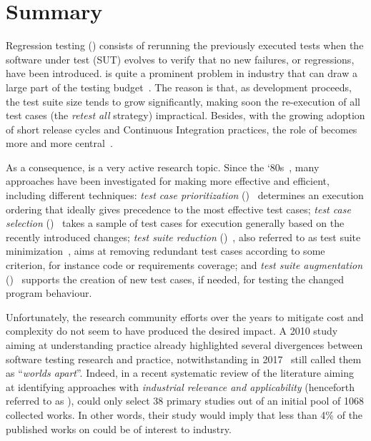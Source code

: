 \section{Summary}\label{sec:lit_summary}

Regression testing (\rt) consists of rerunning the previously executed tests when the software under test (SUT) evolves to verify that no new failures, or regressions, have been introduced. 
\rt is quite a prominent problem in industry that can draw a large part of the testing budget~\citep{Herzig2015,Labuschagne}. 
The reason is that, as development proceeds, the test suite size tends to grow significantly, making soon the re-execution of all test cases (the \textit{retest all} strategy) impractical. Besides, with the growing adoption of short release cycles and Continuous Integration practices, the role of \rt becomes more and more central~\citep{shi_understanding_2019,memon2017taming}.

As a consequence, \rt is a very active research topic.  Since the `80s~\citep{leung1989insights,yoo2012regression}, many approaches have been investigated for making \rt more effective and efficient, including different techniques: 
	\textit{test case prioritization} (\tcp)~\cite{khatibsyarbini_test_2018} determines an execution ordering that ideally gives precedence to the most effective test cases;
	\textit{test case selection} (\tcs)~\cite{kazmi_effective_2017} takes a sample of test cases for execution generally based on the recently introduced changes; 
	\textit{test suite reduction} (\tsr)~\cite{rehman_khan_systematic_2018}, also referred to as test suite minimization~\cite{yoo2012regression}, 
	aims at removing redundant test cases according to some criterion, for instance code or requirements coverage;
	and \textit{test suite augmentation} (\tsa)~\cite{SantelicesCAOH08} supports the creation of new test cases, if needed, for testing the changed program behaviour.

Unfortunately, the research community efforts over the years to mitigate \rt cost and complexity do not seem to have produced the desired impact.
A 2010 study~\cite{engstrom2010qualitative} aiming at understanding \rt practice already highlighted several divergences between software testing research and practice,
notwithstanding in 2017~\citet{garousi2017worlds}  
still called them as ``\textit{worlds apart}''. 
Indeed, in a recent systematic review of the \rt literature aiming at identifying approaches with \textit{industrial relevance and applicability} (henceforth referred to as \rea),
\citet{bin_ali_search_2019} could  only select 38 primary studies out of an initial pool of 1068 collected works.
In other words, their study would imply that 
less than 4\% of the published works on \rt could be of interest to industry. 

